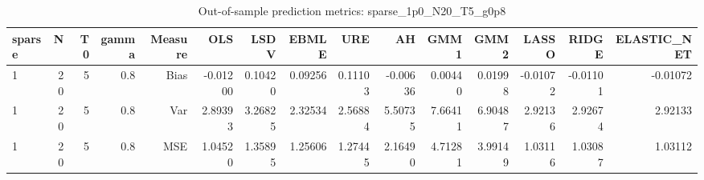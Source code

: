 \begin{table}[!htbp]\centering
\caption{Out-of-sample prediction metrics: sparse_1p0_N20_T5_g0p8}
\label{tab:table3_sparse_1p0_N20_T5_g0p8}
\begin{tabular}{lrrrrrrrrrrrrrr}
\hline
sparse & N & T0 & gamma & Measure & OLS & LSDV & EBMLE & URE & AH & GMM1 & GMM2 & LASSO & RIDGE & ELASTIC_NET \\
\hline
1 & 20 & 5 & 0.8 & Bias & -0.01200 & 0.10420 & 0.09256 & 0.11103 & -0.00636 & 0.00440 & 0.01998 & -0.01072 & -0.01101 & -0.01072 \\
1 & 20 & 5 & 0.8 & Var & 2.89393 & 3.26825 & 2.32534 & 2.56884 & 5.50735 & 7.66411 & 6.90487 & 2.92136 & 2.92674 & 2.92133 \\
1 & 20 & 5 & 0.8 & MSE & 1.04520 & 1.35895 & 1.25606 & 1.27445 & 2.16490 & 4.71281 & 3.99149 & 1.03116 & 1.03087 & 1.03112 \\
\hline
\end{tabular}
\end{table}

